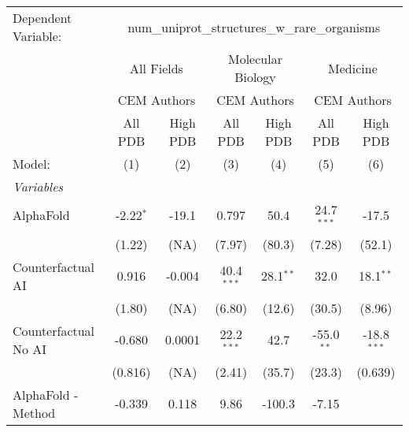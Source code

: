 \begingroup
\centering
\begin{tabular}{lcccccc}
   \tabularnewline \midrule \midrule
   Dependent Variable: & \multicolumn{6}{c}{num\_uniprot\_structures\_w\_rare\_organisms}\\
 & \multicolumn{2}{c}{All Fields} & \multicolumn{2}{c}{Molecular Biology} & \multicolumn{2}{c}{Medicine} \\
\cmidrule(lr){2-3} \cmidrule(lr){4-5} \cmidrule(lr){6-7}
 & \multicolumn{2}{c}{CEM Authors} & \multicolumn{2}{c}{CEM Authors} & \multicolumn{2}{c}{CEM Authors} \\
\cmidrule(lr){2-3} \cmidrule(lr){4-5} \cmidrule(lr){6-7}
 & \multicolumn{1}{c}{All PDB} & \multicolumn{1}{c}{High PDB} & \multicolumn{1}{c}{All PDB} & \multicolumn{1}{c}{High PDB} & \multicolumn{1}{c}{All PDB} & \multicolumn{1}{c}{High PDB} \\
\cmidrule(lr){2-2} \cmidrule(lr){3-3} \cmidrule(lr){4-4} \cmidrule(lr){5-5} \cmidrule(lr){6-6} \cmidrule(lr){7-7}
   Model:                                                     & (1)         & (2)                   & (3)           & (4)         & (5)           & (6)\\  
   \midrule
   \emph{Variables}\\
   AlphaFold                                                  & -2.22$^{*}$ & -19.1                 & 0.797         & 50.4        & 24.7$^{***}$  & -17.5\\   
                                                              & (1.22)      & (NA)                  & (7.97)        & (80.3)      & (7.28)        & (52.1)\\   
   Counterfactual AI                                          & 0.916       & -0.004                & 40.4$^{***}$  & 28.1$^{**}$ & 32.0          & 18.1$^{**}$\\   
                                                              & (1.80)      & (NA)                  & (6.80)        & (12.6)      & (30.5)        & (8.96)\\   
   Counterfactual No AI                                       & -0.680      & 0.0001                & 22.2$^{***}$  & 42.7        & -55.0$^{**}$  & -18.8$^{***}$\\   
                                                              & (0.816)     & (NA)                  & (2.41)        & (35.7)      & (23.3)        & (0.639)\\   
   AlphaFold - Method                                         & -0.339      & 0.118                 & 9.86          & -100.3      & -7.15         &   \\   

\end{tabular}

